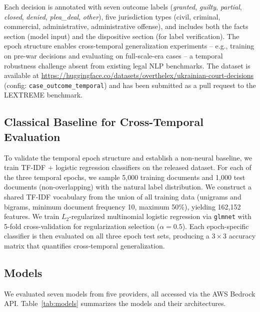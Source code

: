 \documentclass[11pt,a4paper]{article}
\begin{document}
Each decision is annotated with seven outcome labels (\textit{granted}, \textit{guilty}, \textit{partial}, \textit{closed}, \textit{denied}, \textit{plea\_deal}, \textit{other}), five jurisdiction types (civil, criminal, commercial, administrative, administrative offense), and includes both the facts section (model input) and the dispositive section (for label verification). The epoch structure enables cross-temporal generalization experiments -- e.g., training on pre-war decisions and evaluating on full-scale-era cases -- a temporal robustness challenge absent from existing legal NLP benchmarks. The dataset is available at \url{https://huggingface.co/datasets/overthelex/ukrainian-court-decisions} (config: \texttt{case\_outcome\_temporal}) and has been submitted as a pull request to the LEXTREME benchmark.

\subsection{Classical Baseline for Cross-Temporal Evaluation}
\label{sec:classical_baseline}

To validate the temporal epoch structure and establish a non-neural baseline, we train TF-IDF + logistic regression classifiers on the released dataset. For each of the three temporal epochs, we sample 5{,}000 training documents and 1{,}000 test documents (non-overlapping) with the natural label distribution. We construct a shared TF-IDF vocabulary from the union of all training data (unigrams and bigrams, minimum document frequency 10, maximum 50\%), yielding 162{,}152 features. We train $L_2$-regularized multinomial logistic regression via \texttt{glmnet} \citep{friedman2010glmnet} with 5-fold cross-validation for regularization selection ($\alpha = 0.5$). Each epoch-specific classifier is then evaluated on all three epoch test sets, producing a $3 \times 3$ accuracy matrix that quantifies cross-temporal generalization.

\subsection{Models}
\label{sec:models}

We evaluated seven models from five providers, all accessed via the AWS Bedrock API. Table~\ref{tab:models} summarizes the models and their architectures.
\end{document}
